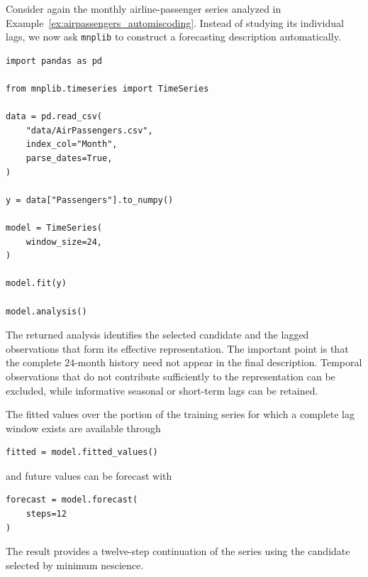 \begin{example}
\label{ex:auto_timeseries}

Consider again the monthly airline-passenger series analyzed in
Example~\ref{ex:airpassengers_automiscoding}. Instead of studying its individual
lags, we now ask \texttt{mnplib} to construct a forecasting description
automatically.

\begin{sourcecode}
{\scriptsize
\begin{verbatim}
import pandas as pd

from mnplib.timeseries import TimeSeries

data = pd.read_csv(
    "data/AirPassengers.csv",
    index_col="Month",
    parse_dates=True,
)

y = data["Passengers"].to_numpy()

model = TimeSeries(
    window_size=24,
)

model.fit(y)

model.analysis()
\end{verbatim}}
\end{sourcecode}

The returned analysis identifies the selected candidate and the lagged
observations that form its effective representation. The important point is that
the complete \(24\)-month history need not appear in the final description.
Temporal observations that do not contribute sufficiently to the representation
can be excluded, while informative seasonal or short-term lags can be retained.

The fitted values over the portion of the training series for which a complete
lag window exists are available through

\begin{sourcecode}
{\scriptsize
\begin{verbatim}
fitted = model.fitted_values()
\end{verbatim}}
\end{sourcecode}

and future values can be forecast with

\begin{sourcecode}
{\scriptsize
\begin{verbatim}
forecast = model.forecast(
    steps=12
)
\end{verbatim}}
\end{sourcecode}

The result provides a twelve-step continuation of the series using the candidate
selected by minimum nescience.
\end{example}

